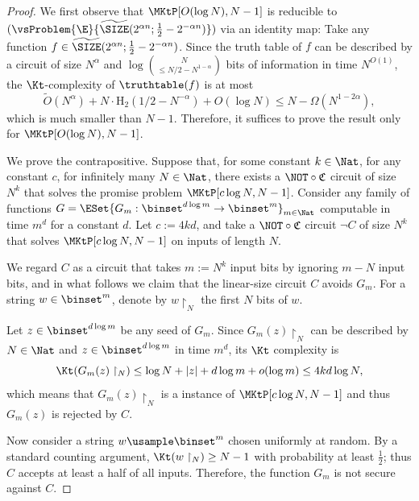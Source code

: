 \documentclass{toc}
\begin{document}
\begin{proof}
  We first observe that
  $\MKtP[O(\log N), N - 1]$
  is reducible to
  $(\vsProblem{\E}{\widetilde{\SIZE}(2^{\alpha n}; \frac{1}{2} - 2^{- \alpha n})})$
  via an identity map:
  Take any function $f \in \widetilde{\SIZE}({2^{\alpha n}; \frac{1}{2} - 2^{- \alpha n}})$.
  Since the truth table of $f$ can be described by a circuit of size $N^\alpha$ and $\log \binom{N}{\le N/2 - N^{1 - \alpha}}$ bits of information
  in time $N^{O(1)}$,
  the $\Kt$-complexity of $\truthtable(f)$ is at most
  $$
    \widetilde{O}(N^\alpha) + N \cdot \mathrm{H}_2(1 / 2 - N^{-\alpha}) + O(\log N) \le N - \Omega(N^{1 - 2 \alpha}),
  $$
  which is much smaller than $N - 1$.
  Therefore, it suffices to prove the result only for $\MKtP[O(\log N), N - 1]$.

  We prove the contrapositive.
  Suppose that, for some constant $k \in \Nat$,
  for any constant $c$,
  for infinitely many $N \in \Nat$,
  there exists a $\NOT \circ \mathfrak{C}$ circuit of size $N^{k}$ that solves
  the promise problem $\MKtP[c \log N, N - 1]$.
  Consider any family of functions $G = \ESet{ G_m : \binset^{d \log m} \to \binset^m }_{m \in \Nat} $ computable in time $m^{d}$ for a constant $d$.
  Let $c := 4 k d$, and take a $\NOT \circ \mathfrak{C}$ circuit $\neg C$
  of size $N^k$ that solves $\MKtP[c \log N, N - 1]$ on inputs of length $N$.

  We regard $C$ as a circuit that takes $m := N^k$ input bits by ignoring $m - N$ input bits,
  and in what follows we claim that the linear-size circuit $C$ avoids $G_m$.
  For a string $w \in \binset^m$, denote by $w \restriction_N$ the first $N$ bits of $w$.

  Let $z \in \binset^{d \log m}$ be any seed of $G_m$.
  Since $G_m(z) \restriction_N$ can be described by $N \in \Nat$ and $z \in \binset^{d \log m}$ in time $m^d$,
  its $\Kt$ complexity is
  $$
    \Kt(G_m(z) \restriction_N) \le \log N + |z| + d \log m + o(\log m) \le 4 k d \log N,
  $$
  which means that $G_m(z) \restriction_N$ is a \Yes instance of $\MKtP[c \log N, N - 1]$ and thus $G_m(z)$ is rejected by $C$.

  Now consider a string $w \usample \binset^m$ chosen uniformly at random.
  By a standard counting argument, $\Kt(w \restriction_N) \ge N - 1$ with probability at least $\frac{1}{2}$;
  thus $C$ accepts at least a half of all inputs.
  Therefore, the function $G_m$ is not secure against $C$.
\end{proof}
\end{document}
